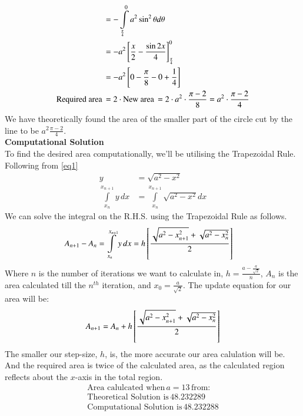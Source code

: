 \documentclass[journal]{IEEEtran}
\begin{document}
\begin{align}
	&= -\int\limits_{\frac{\pi}{4}}^{0} a^2 \sin^2\theta d\theta\\
	&= -a^2{}\left[\frac{x}{2}-\frac{\sin2x}{4}\right]_{\frac{\pi}{4}}^{0}\\
	&= -a^2{}\left[0 -\frac{\pi}{8} - 0 + \frac{1}{4}\right]\\
	\text{Required area}\, &= 2\cdot\text{New area} \, = 2\cdot a^2\cdot\frac{\pi-2}{8} = a^2\cdot\frac{\pi-2}{4}
\end{align}
We have theoretically found the area of the smaller part of the circle cut by the line to be $a^2 \frac{\pi-2}{4}$.\\
\textbf{Computational Solution}\\
To find the desired area computationally, we'll be utilising the Trapezoidal Rule.\\
Following from \ref{eq1}
\begin{align}
	y &= \sqrt{a^2-x^2} \nonumber\\
	\int\limits_{x_n}^{x_{n+1}} y \, dx &= \int\limits_{x_n}^{x_{n+1}} \sqrt{a^2-x^2} dx
\end{align}
We can solve the integral on the R.H.S. using the Trapezoidal Rule as follows.
\begin{align}
	A_{n+1}-A_{n} = 	\int\limits_{x_n}^{x_{n+1}} y \, dx &= h{}\left[\frac{\sqrt{a^2-x_{n+1}^2} + \sqrt{a^2-x_n^2}}{2}\right]
\end{align}
Where $n$ is the number of iterations we want to calculate in, $h = \frac{a-\frac{a}{\sqrt{2}}}{n}$, $A_{n}$ is the area calculated till the $n^{th}$ iteration, and $x_0 = \frac{a}{\sqrt{2}}$.
The update equation for our area will be:
\begin{align}
	A_{n+1} = A_{n} +  h{}\left[\frac{\sqrt{a^2-x_{n+1}^2} + \sqrt{a^2-x_n^2}}{2}\right]
\end{align}
The smaller our step-size, $h$, is, the more accurate our area calulation will be.\\
And the required area is twice of the calculated area, as the calculated region reflects about the $x$-axis in the total region.
\begin{align*}
	\text{Area calulcated when}\, a=13 \,\text{from:}\\
	\text{Theoretical Solution is}\, 48.232289\\
	\text{Computational Solution is}\, 48.232288
\end{align*}
\end{document}
